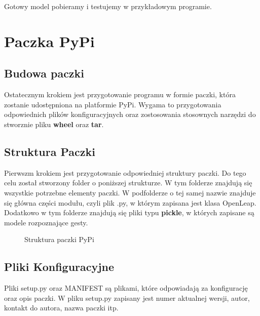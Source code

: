     \quad Gotowy model pobieramy i testujemy w przykładowym programie. 
    
    \section{Paczka PyPi}
    \subsection{Budowa paczki}
    
    \quad Ostatecznym krokiem jest przygotowanie programu w formie paczki, która zostanie udostępniona na platformie PyPi. Wygama to przygotowania odpowiednich plików konfiguracyjnych oraz zostosowania stosownych narzędzi do stworznie pliku \textbf{wheel} oraz \textbf{tar}. 
    
    \subsection{Struktura Paczki}
    \quad Pierwszm krokiem jest przygotowanie odpowiedniej struktury paczki. Do tego celu został stworzony folder o poniższej strukturze. W tym folderze znajdują się wszystkie potrzebne elementy paczki. W podfolderze o tej samej nazwie znajduje się główna części modułu, czyli plik .py, w którym zapisana jest klasa OpenLeap. Dodatkowo w tym folderze znajdują się pliki typu \textbf{pickle}, w których zapisane są modele rozpoznające gesty.
    
    \begin{figure}
    \centering
        \begin{minipage}{7cm}
        \end{minipage}
        \caption{Struktura paczki PyPi}
    \end{figure}
    
    \subsection{Pliki Konfiguracyjne}
    \quad Pliki setup.py oraz MANIFEST są plikami, które odpowiadają za konfigurację oraz opis paczki. W pliku setup.py zapisany jest numer aktualnej wersji, autor, kontakt do autora, nazwa paczki itp. 
    
